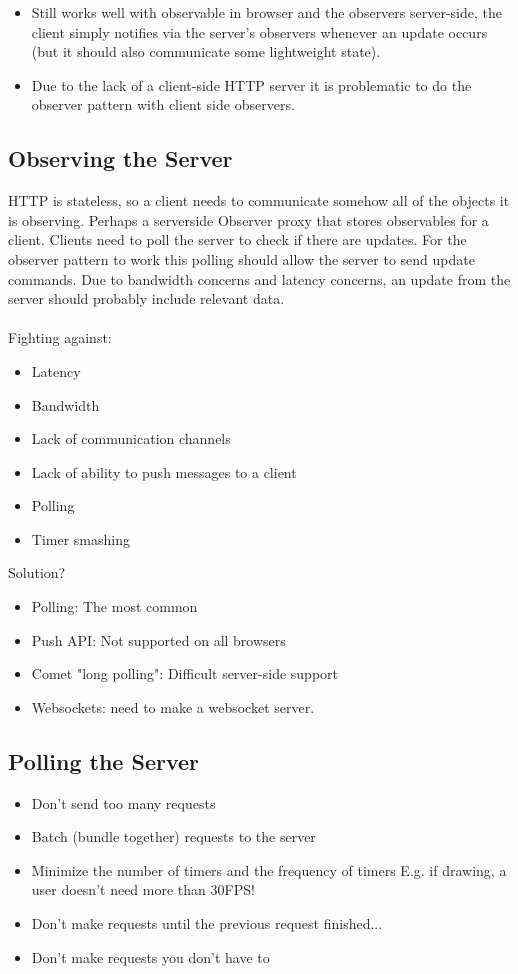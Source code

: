 \documentclass[../CMPUT-404-Notes.tex]{subfiles}
\begin{document}
\begin{itemize}
    \item Still works well with observable in browser and the observers server-side, the client simply notifies via the server's observers whenever an update occurs (but it should also communicate some lightweight state).
    \item  Due to the lack of a client-side HTTP server it is problematic to do the observer pattern with client side observers.
\end{itemize}

\subsection{Observing the Server}
HTTP is stateless, so a client needs to communicate somehow all of the objects it is observing.
Perhaps a serverside Observer proxy that stores observables for a client.
Clients need to poll the server to check if there are updates. For the observer pattern to work this polling should allow the server to send update commands.
Due to bandwidth concerns and latency concerns, an update from the server should probably include relevant data.
\\~\\
Fighting against:
\begin{itemize}
    \item Latency
    \item Bandwidth
    \item Lack of communication channels 
    \item Lack of ability to push messages to a client 
    \item Polling
    \item Timer smashing
\end{itemize}
Solution?
\begin{itemize}
    \item Polling: The most common 
    \item Push API: Not supported on all browsers 
    \item Comet "long polling": Difficult server-side support 
    \item Websockets: need to make a websocket server.
\end{itemize}

\subsection{Polling the Server}
\begin{itemize}
    \item Don't send too many requests
    \item Batch (bundle together) requests to the server
    \item Minimize the number of timers and the frequency of timers
    \quad E.g. if drawing, a user doesn't need more than 30FPS!
    \item Don't make requests until the previous request finished...
    \item Don't make requests you don't have to
\end{itemize}
\end{document}
